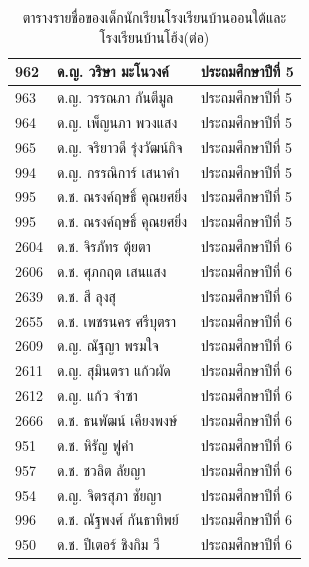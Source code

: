\begin{table}[h]
\begin{center}
\begin{tabular}{ |p{3cm}|p{4cm}|p{3cm}| }
            \hline
            962 & ด.ญ. วริษา มะโนวงค์ & ประถมศึกษาปีที่ 5\\
            \hline
            963 & ด.ญ. วรรณภา กันตีมูล & ประถมศึกษาปีที่ 5\\
            \hline
            964 & ด.ญ. เพ็ญนภา พวงแสง & ประถมศึกษาปีที่ 5\\
            \hline
            965 & ด.ญ. จริยาวดี รุ่งวัฒน์กิจ & ประถมศึกษาปีที่ 5\\
            \hline
            994 & ด.ญ. กรรณิการ์ เสนาคำ & ประถมศึกษาปีที่ 5\\
            \hline
            995 & ด.ช. ณรงค์ฤษธิ์ คุณยศยิ่ง & ประถมศึกษาปีที่ 5\\
            \hline
            995 & ด.ช. ณรงค์ฤษธิ์ คุณยศยิ่ง & ประถมศึกษาปีที่ 5\\
            \hline
            2604 & ด.ช. จิรภัทร ตุ้ยตา & ประถมศึกษาปีที่ 6\\
            \hline
            2606 & ด.ช. ศุภกฤต เสนแสง & ประถมศึกษาปีที่ 6\\
            \hline
            2639 & ด.ช. สี ลุงสุ & ประถมศึกษาปีที่ 6\\
            \hline
            2655 & ด.ช. เพชรนคร ศรีบุตรา & ประถมศึกษาปีที่ 6\\
            \hline
            2609 & ด.ญ. ณัฐญา พรมใจ & ประถมศึกษาปีที่ 6\\
            \hline
            2611 & ด.ญ. สุมินตรา แก้วผัด & ประถมศึกษาปีที่ 6\\
            \hline
            2612 & ด.ญ. แก้ว จำซา & ประถมศึกษาปีที่ 6\\
            \hline
            2666 & ด.ช. ธนพัฒน์ เคียงพงษ์ & ประถมศึกษาปีที่ 6\\
            \hline
            951 & ด.ช. หิรัญ ฟูคำ & ประถมศึกษาปีที่ 6\\
            \hline
            957 & ด.ช. ชวลิต ลัยญา & ประถมศึกษาปีที่ 6\\
            \hline
            954 & ด.ญ. จิตรสุภา ชัยญา & ประถมศึกษาปีที่ 6\\
            \hline
            996 & ด.ช. ณัฐพงศ์ กันธาทิพย์ & ประถมศึกษาปีที่ 6\\
            \hline
            950 & ด.ช. ปีเตอร์ ชิงกิม วี & ประถมศึกษาปีที่ 6\\
            \hline
        \end{tabular}
    \end{center}
    \caption[ตารางรายชื่อของเด็กนักเรียนโรงเรียนบ้านออนใต้และโรงเรียนบ้านโฮ้ง(ต่อ)]{ตารางรายชื่อของเด็กนักเรียนโรงเรียนบ้านออนใต้และโรงเรียนบ้านโฮ้ง(ต่อ)}
    \label{studentstablecontinue}
\end{table}

